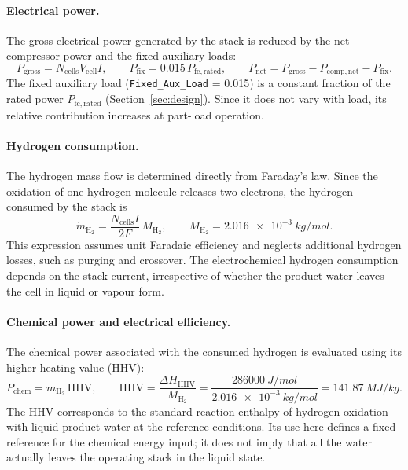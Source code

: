 \documentclass[a4paper,11pt]{article}
\newcommand{\code}[1]{\nolinkurl{#1}}
\begin{document}
\paragraph{Electrical power.}
The gross electrical power generated by the stack is reduced by the
net compressor power and the fixed auxiliary loads:
\begin{equation}
  P_\mathrm{gross} = N_\mathrm{cells} V_\mathrm{cell} I, \qquad
  P_\mathrm{fix} = 0.015\,P_\mathrm{fc,rated}, \qquad
  P_\mathrm{net} = P_\mathrm{gross} - P_\mathrm{comp,net} - P_\mathrm{fix}.
  \label{eq:pnet}
\end{equation}
The fixed auxiliary load (\code{Fixed_Aux_Load} = 0.015) is a constant
fraction of the rated power $P_\mathrm{fc,rated}$ (Section~\ref{sec:design}).
Since it does not vary with load, its relative contribution increases
at part-load operation.

\paragraph{Hydrogen consumption.}
The hydrogen mass flow is determined directly from Faraday's law.
Since the oxidation of one hydrogen molecule releases two electrons,
the hydrogen consumed by the stack is
\begin{equation}
  \dot m_{\mathrm{H_2}} =
  \frac{N_\mathrm{cells} I}{2F}\,M_{\mathrm{H_2}},
  \qquad
  M_{\mathrm{H_2}} = \SI{2.016e-3}{kg/mol}.
  \label{eq:mh2}
\end{equation}
This expression assumes unit Faradaic efficiency and neglects additional
hydrogen losses, such as purging and crossover. The electrochemical
hydrogen consumption depends on the stack current, irrespective of
whether the product water leaves the cell in liquid or vapour form.

\paragraph{Chemical power and electrical efficiency.}
The chemical power associated with the consumed hydrogen is evaluated
using its higher heating value (HHV):
\begin{equation}
  P_\mathrm{chem} = \dot m_{\mathrm{H_2}}\,\mathrm{HHV},
  \qquad
  \mathrm{HHV} = \frac{\Delta H_\mathrm{HHV}}{M_{\mathrm{H_2}}}
  = \frac{\SI{286000}{J/mol}}{\SI{2.016e-3}{kg/mol}}
  = \SI{141.87}{MJ/kg}.
\end{equation}
The HHV corresponds to the standard reaction enthalpy of hydrogen
oxidation with liquid product water at the reference conditions.
Its use here defines a fixed reference for the chemical energy input;
it does not imply that all the water actually leaves the operating
stack in the liquid state.
\end{document}
